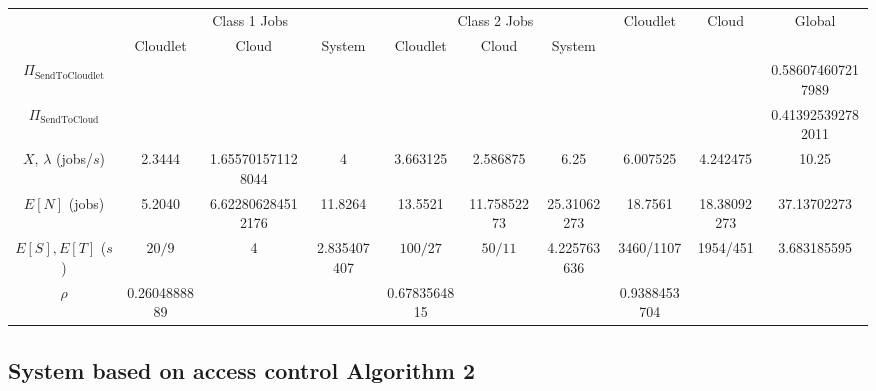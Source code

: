 \documentclass[10pt,a4paper]{article}
\begin{document}
\begin{table}[h!]
    \centering
    \small
    \begin{adjustbox}{center=\textwidth}
     \begin{tabular}{c|c|c|c|c|c|c|c|c|c}

      \toprule
      
      & \multicolumn{3}{c|}{ Class 1 Jobs} & \multicolumn{3}{c|}{Class 2 Jobs} & \multirow{2}{*}{Cloudlet} & \multirow{2}{*}{Cloud} & \multirow{2}{*}{Global} \\ \cline{2-7}
      
      & Cloudlet & Cloud & System & Cloudlet & Cloud & System & \\
      \midrule
      $\Pi_{\text{SendToCloudlet}}$ & & & & & & & & & 0.586074607217989  \\
      \hline
      $\Pi_{\text{SendToCloud}}$ & & & & & & & & & 0.413925392782011  \\
      \hline
	  $X$, $\lambda$ (jobs/$s$) & 2.3444 & 1.655701571128044 & 4 & 3.663125 & 2.586875 & 6.25 & 6.007525 & 4.242475 & 10.25 \\     
      \hline
      $E[N]$ (jobs) & 5.2040 & 6.622806284512176 & 11.8264 & 13.5521 & 11.75852273 & 25.31062273 & 18.7561 & 18.38092273 & 37.13702273 \\
      \hline
      $E[S], E[T]$ ($s$)& $20/9$ & 4 & 2.835407407 & $100/27$ & $50/11$ & 4.225763636 & 3460/1107 & 1954/451 & 3.683185595 \\
      \hline
	  $\rho$ & 0.2604888889 & & & 0.6783564815 & &  & 0.9388453704 & &  \\
     
       
 
     
      \bottomrule

    \end{tabular}
    \end{adjustbox}
\end{table}



\newpage
\subsection{System based on access control Algorithm 2}
\end{document}
